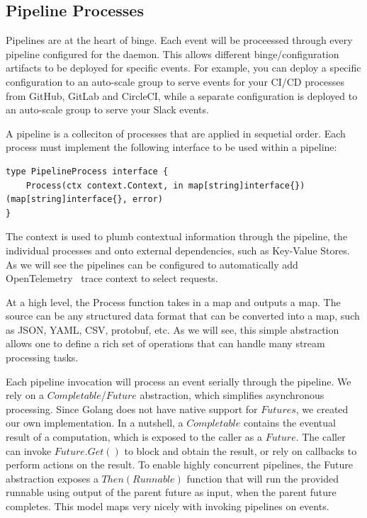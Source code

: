 \documentclass[10pt,twocolumn]{article}
\begin{document}
\subsection{Pipeline Processes}\label{sec:pipelineproc}

Pipelines are at the heart of binge.  Each event will be proceessed through
every pipeline configured for the daemon.  This allows different
binge/configuration artifacts to be deployed for specific events.  For example,
you can deploy a specific configuration to an auto-scale group to serve events
for your CI/CD processes from GitHub, GitLab and CircleCI, while a separate
configuration is deployed to an auto-scale group to serve your Slack
events.

A pipeline is a colleciton of processes that are applied in sequetial order.
Each process must implement the following interface to be used within a pipeline:

\begin{lstlisting}[linewidth=\columnwidth,breaklines=true]
type PipelineProcess interface {
	Process(ctx context.Context, in map[string]interface{}) (map[string]interface{}, error)
}
\end{lstlisting}

The context is used to plumb contextual information through the pipeline, the
individual processes and onto external dependencies, such as Key-Value Stores.
As we will see the pipelines can be configured to automatically add
OpenTelemetry~\cite{OT} trace context to select requests.

At a high level, the Process function takes in a map and outputs a map.  The
source can be any structured data format that can be converted into a map, such
as JSON, YAML, CSV, protobuf, etc.  As we will see, this simple abstraction
allows one to define a rich set of operations that can handle many stream
processing tasks.

Each pipeline invocation will process an event serially through the pipeline.
We rely on a $Completable$/$Future$ abstraction, which simplifies asynchronous
processing.  Since Golang does not have native support for $Futures$, we
created our own implementation.  In a nutshell, a $Completable$ contains the
eventual result of a computation, which is exposed to the caller as a $Future$.
The caller can invoke $Future.Get()$ to block and obtain the result, or rely on
callbacks to perform actions on the result.  To enable highly concurrent
pipelines, the Future abstraction exposes a $Then(Runnable)$ function
that will run the provided runnable using output of the parent future as input,
when the parent future completes.  This model maps very nicely with invoking
pipelines on events.
\end{document}
